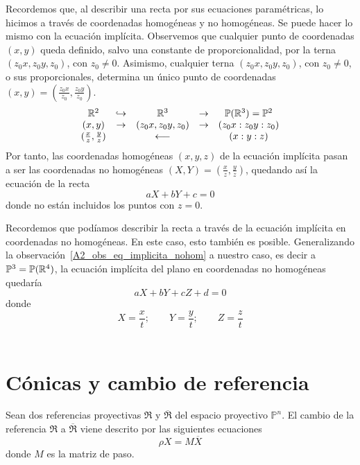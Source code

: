 \begin{obs}
	\label{A2_obs_eq_implicita_nohom}
	Recordemos que, al describir una recta por sus ecuaciones paramétricas, lo hicimos a través de coordenadas homogéneas y no homogéneas. Se puede hacer lo mismo con la ecuación implícita. Observemos que cualquier punto de coordenadas $(x,y)$ queda definido, salvo una constante de proporcionalidad, por la terna $(z_0x,z_0y,z_0)$, con $z_0\not=0$. Asimismo, cualquier terna $(z_0x,z_0y,z_0)$, con $z_0\not=0$, o sus proporcionales, determina un único punto de coordenadas $(x,y)=(\frac{z_0x}{z_0},\frac{z_0y}{z_0})$.
	\begin{equation*}
		\begin{array}{ccccc}
			\mathbb{R}^2&\hookrightarrow&\mathbb{R}^3&\rightarrow &\mathbb{P}(\mathbb{R}^3)=\mathbb{P}^2\\
			(x,y)&\rightarrow &(z_0x,z_0y,z_0)&\rightarrow &(z_0x:z_0y:z_0)\\
			(\frac{x}{z},\frac{y}{z})&&\longleftarrow &&(x:y:z)
		\end{array}
	\end{equation*}
	Por tanto, las coordenadas homogéneas $(x,y,z)$ de la ecuación implícita pasan a ser las coordenadas no homogéneas $(X,Y)=(\frac{x}{z},\frac{y}{z})$, quedando así la ecuación de la recta
	\begin{equation}
		\label{A2_eq_implicita_nohom}
		aX+bY+c=0
	\end{equation}
	donde no están incluidos los puntos con $z=0$.\\
\end{obs}

\begin{obs}
	Recordemos que podíamos describir la recta a través de la ecuación implícita en coordenadas no homogéneas. En este caso, esto también es posible. Generalizando la observación~\ref{A2_obs_eq_implicita_nohom} a nuestro caso, es decir a $\mathbb{P}^3=\mathbb{P}(\mathbb{R}^4)$, la ecuación implícita del plano en coordenadas no homogéneas quedaría
	\begin{equation}
		\label{A2_eq_implicita_plano_nohom}
		aX+bY+cZ+d=0
	\end{equation}
	donde 
	\begin{equation*}
		X=\frac{x}{t};\qquad Y=\frac{y}{t};\qquad Z=\frac{z}{t}
	\end{equation*}\\
\end{obs}

\section{Cónicas y cambio de referencia}
Sean dos referencias proyectivas $\mathfrak{R}$ y $\overline{\mathfrak{R}}$ del espacio proyectivo $\mathbb{P}^n$. El cambio de la referencia $\mathfrak{R}$ a $\overline{\mathfrak{R}}$ viene descrito por las siguientes ecuaciones
\begin{equation}
\rho X=M\overline{X}
\end{equation}
donde $M$ es la matriz de paso. 

